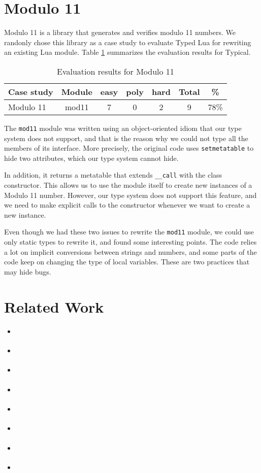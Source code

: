 \section{Modulo 11}

Modulo 11 \citep{luamod11} is a library that generates and verifies
modulo 11 numbers.
We randonly chose this library as a case study to evaluate Typed Lua
for rewriting an existing Lua module.
Table \ref{tab:evalmod11} summarizes the evaluation results for Typical.

\begin{table}[!ht]
\begin{center}
\begin{tabular}{|l|c|c|c|c|c|c|}
\hline
\textbf{Case study} & \textbf{Module} & \textbf{easy} & \textbf{poly} & \textbf{hard} & \textbf{Total} & \textbf{\%} \\
\hline
\multirow{1}{*}{Modulo 11}
& mod11 & 7 & 0 & 2 & 9 & 78\% \\
\hline
\end{tabular}
\end{center}
\caption{Evaluation results for Modulo 11}
\label{tab:evalmod11}
\end{table}

The \texttt{mod11} module was written using an object-oriented idiom that
our type system does not support, and that is the reason why we could not
type all the members of its interface.
More precisely, the original code uses \texttt{setmetatable} to hide
two attributes, which our type system cannot hide.

In addition, it returns a metatable that extends \texttt{\string_\string_call}
with the class constructor.
This allows us to use the module itself to create new instances of a
Modulo 11 number.
However, our type system does not support this feature, and we need to
make explicit calls to the constructor whenever we want to create a
new instance.

Even though we had these two issues to rewrite the \texttt{mod11} module,
we could use only static types to rewrite it, and found some interesting
points.
The code relies a lot on implicit conversions between strings and numbers,
and some parts of the code keep on changing the type of local variables.
These are two practices that may hide bugs.

\section{Related Work}

\begin{itemize}
\item \citep{tidallock}
\item \citep{bonnaire-sergeant2012typed-clojure}
\item \citep{vitousek2014deg}
\item \citep{allende2013gts}
\item \citep{tobin-hochstadt2008ts} 
\item \citep{dart}
\item \citep{typescript}
\item \citep{politz2012semantics}
\end{itemize}

